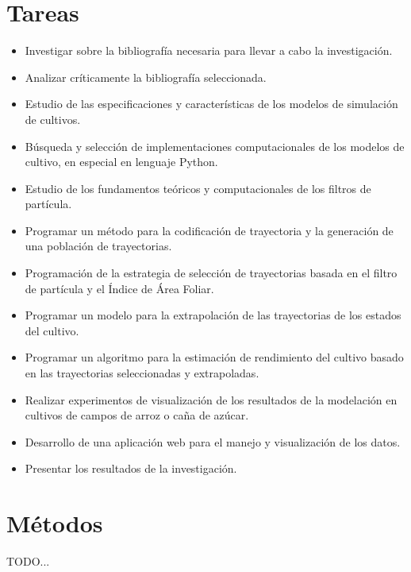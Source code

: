 \section*{Tareas}
\begin{itemize}
	\item Investigar sobre la bibliografía necesaria para llevar a cabo la investigación.
	\item Analizar críticamente la bibliografía seleccionada.
	\item Estudio de las especificaciones y características de los modelos de simulación de cultivos.
	\item Búsqueda y selección de implementaciones computacionales de los modelos de cultivo, en especial en lenguaje Python.
	\item Estudio de los fundamentos teóricos y computacionales de los filtros de partícula.
	\item Programar un método para la codificación de trayectoria y la generación de una población de trayectorias.
	\item Programación de la estrategia de selección de trayectorias basada en el filtro de partícula y el Índice de Área Foliar.
	\item Programar un modelo para la extrapolación de las trayectorias de los estados del cultivo.
	\item Programar un algoritmo para la estimación de rendimiento del cultivo basado en las trayectorias seleccionadas y extrapoladas.
	\item Realizar experimentos de visualización de los resultados de la modelación en cultivos de campos de arroz o caña de azúcar.
	\item Desarrollo de una aplicación web para el manejo y visualización de los datos.
	\item Presentar los resultados de la investigación.
\end{itemize}

\section*{Métodos}
TODO...

